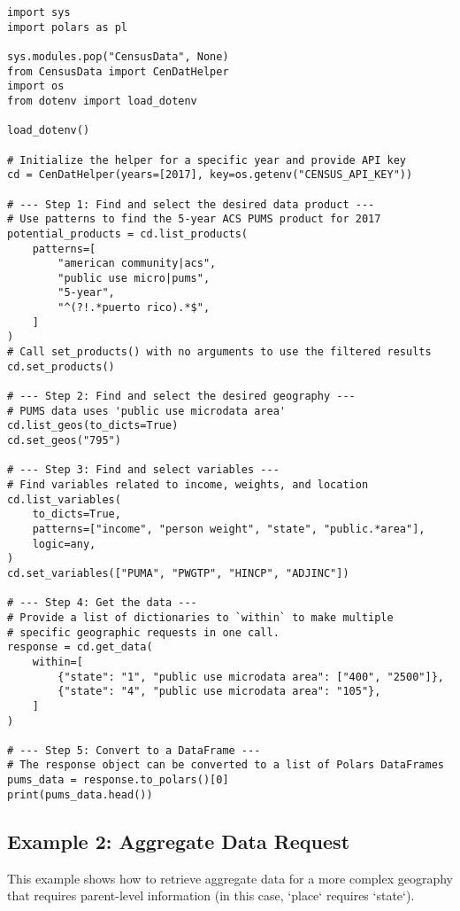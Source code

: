 \documentclass{article}
\begin{document}
\begin{verbatim}
import sys
import polars as pl

sys.modules.pop("CensusData", None)
from CensusData import CenDatHelper
import os
from dotenv import load_dotenv

load_dotenv()

# Initialize the helper for a specific year and provide API key
cd = CenDatHelper(years=[2017], key=os.getenv("CENSUS_API_KEY"))

# --- Step 1: Find and select the desired data product ---
# Use patterns to find the 5-year ACS PUMS product for 2017
potential_products = cd.list_products(
    patterns=[
        "american community|acs",
        "public use micro|pums",
        "5-year",
        "^(?!.*puerto rico).*$",
    ]
)
# Call set_products() with no arguments to use the filtered results
cd.set_products()

# --- Step 2: Find and select the desired geography ---
# PUMS data uses 'public use microdata area'
cd.list_geos(to_dicts=True)
cd.set_geos("795")

# --- Step 3: Find and select variables ---
# Find variables related to income, weights, and location
cd.list_variables(
    to_dicts=True,
    patterns=["income", "person weight", "state", "public.*area"],
    logic=any,
)
cd.set_variables(["PUMA", "PWGTP", "HINCP", "ADJINC"])

# --- Step 4: Get the data ---
# Provide a list of dictionaries to `within` to make multiple
# specific geographic requests in one call.
response = cd.get_data(
    within=[
        {"state": "1", "public use microdata area": ["400", "2500"]},
        {"state": "4", "public use microdata area": "105"},
    ]
)

# --- Step 5: Convert to a DataFrame ---
# The response object can be converted to a list of Polars DataFrames
pums_data = response.to_polars()[0]
print(pums_data.head())
\end{verbatim}

\subsection{Example 2: Aggregate Data Request}
This example shows how to retrieve aggregate data for a more complex geography that requires parent-level information (in this case, `place` requires `state`).
\end{document}
